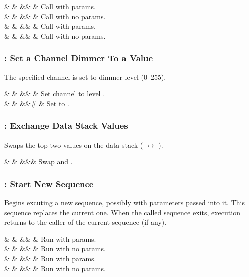 \documentclass[letterpaper,twoside,onecolumn,openright,final]{memoir}
\begin{document}
{\begin{opdesc}
   &            &           &&\z{\$,\$} & Call  with  params.\\
   &            &           &&\z{\$}    & Call  with no params.\\
   &  &  &&\z{\#}\z{,\#} & Call  with  params.\\
   &  &           &&\z{\#} & Call  with no params.\\
\end{opdesc}


\subsubsection{: Set a Channel Dimmer To a Value}
The specified channel  is set to dimmer level  (0--255).

\begin{opdesc}
   &            &           &&\z{\$,\$} & Set channel  to level .\\
   &  &  &&\z\#\z{,\#} & Set  to .\\
\end{opdesc}

\subsubsection{: Exchange Data Stack Values}
Swaps the top two values on the data stack ( $\leftrightarrow$ ).

\begin{opdesc}
   &            &           &&& Swap  and .\\
\end{opdesc}

\subsubsection{: Start New Sequence}
Begins excuting a new sequence, possibly with parameters passed into it.
This sequence replaces the current one.  When the called sequence  exits,
execution returns to the caller of the current sequence (if any).

\begin{opdesc}
   &            &           &&\z{\$,\$} & Run  with  params.\\
   &            &           &&\z{\$}    & Run  with no params.\\
   &  &  &&\z{\#}\z{,\#} & Run  with  params.\\
   &  &           &&\z{\#} & Run  with no params.\\
\end{opdesc}

}
\end{document}
